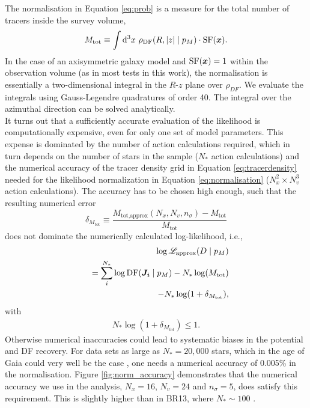 The normalisation in Equation \ref{eq:prob} is a measure for the total number of tracers inside the survey volume,
\begin{equation}
M_\text{tot} \equiv \int \mathop{}\!\mathrm{d^3} x \  \rho_\text{DF}(R,|z| \mid p_M) \cdot \text{SF}(\boldsymbol{x}).\label{eq:normalisation}
\end{equation}
In the case of an axisymmetric galaxy model and $\text{SF}(\boldsymbol{x})=1$ within the observation volume (as in most tests in this work), the normalisation is essentially a two-dimensional integral in the $R$-$z$ plane over $\rho_{DF}$. We evaluate the integrals using Gauss-Legendre quadratures of order 40. The integral over the azimuthal direction can be solved analytically. 
\\It turns out that a sufficiently accurate evaluation of the likelihood is computationally expensive, even for only one set of model parameters. This expense is dominated by the number of action calculations required, which in turn depends on the number of stars in the sample ($N_*$ action calculations) and the numerical accuracy of the tracer density grid in Equation \ref{eq:tracerdensity} needed for the likelihood normalization in Equation \ref{eq:normalisation} ($N_x^2 \times N_v^3$ action calculations). The accuracy has to be chosen high enough, such that the resulting numerical error 
\begin{equation}
\delta_{M_\text{tot}} \equiv \frac{M_\text{tot,approx}(N_x,N_v,n_\sigma) -  M_\text{tot} }{M_\text{tot}}\label{eq:relerrlikelihood}
\end{equation}
does not dominate the numerically calculated log-likelihood, i.e.,
\begin{eqnarray}
& &\log \mathscr{L}_\text{approx}(D \mid p_M) \nonumber\\
&& = \sum_i^{N_*} \log \text{DF}(\boldsymbol{J_i} \mid p_M) - N_* \log(M_\text{tot})\nonumber\\
&& - N_* \log (1 + \delta_{M_\text{tot}}),\label{eq:loglikelihood_relerr}
\end{eqnarray}
with
\begin{eqnarray}
N_* \log (1 + \delta_{M_{tot}}) \leq 1.\nonumber
\end{eqnarray}
Otherwise numerical inaccuracies could lead to systematic biases in the potential and DF recovery. For data sets as large as $N_* = 20,000$ stars, which in the age of Gaia could very well be the case \HW{[TO DO: Really???]}, one needs a numerical accuracy of 0.005\% in the normalisation. Figure \ref{fig:norm_accuracy} demonstrates that the numerical accuracy we use in the analysis, $N_x=16$, $N_v=24$ and $n_\sigma=5$, does satisfy this requirement. This is slightly higher than in BR13, where $N_* \sim 100$ \Wilma{[TO DO: CHECK]}.\\


